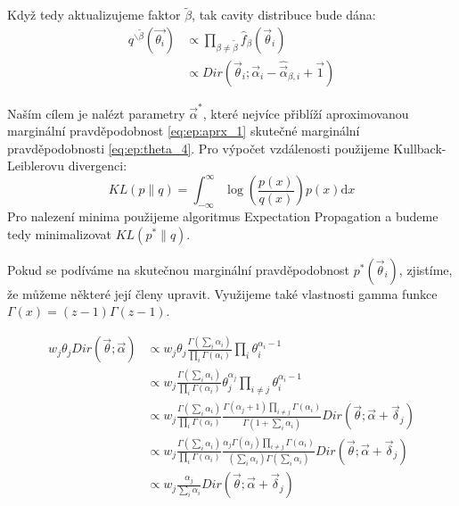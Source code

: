 Když tedy aktualizujeme faktor $\tilde\beta$, tak cavity distribuce bude dána:
\begin{align}
q^{\backslash \tilde\beta}(\vec{\theta_i}) &\propto \prod_{\beta \ne
    \tilde\beta} \hat{f}_{\beta}(\vec{\theta}_i) \\
& \propto Dir(\vec{\theta}_i; \vec{\alpha}_i - \hat{\vec{\alpha}}_{\beta, i} +
    \vec{1})
\end{align}

Naším cílem je nalézt parametry $\vec{\alpha}^*$, které nejvíce přiblíží
aproximovanou marginální pravděpodobnost \eqref{eq:ep:aprx_1} skutečné
marginální pravděpodobnosti \eqref{eq:ep:theta_4}. Pro výpočet vzdálenosti
použijeme Kullback-Leiblerovu divergenci:
\begin{equation}
KL(p \| q) = \int_{-\infty}^{\infty} \log\left(\frac{p(x)}{q(x)}\right)p(x)
    \mathrm{d}x
\end{equation}
Pro nalezení minima použijeme algoritmus Expectation Propagation a budeme tedy
minimalizovat $KL(p^*\| q)$.

Pokud se podíváme na skutečnou marginální pravděpodobnost
$p^*(\vec{\theta}_i)$, zjistíme, že můžeme některé její členy upravit.
Využijeme také vlastnosti gamma funkce $\Gamma(x) = (z-1) \Gamma(z-1)$.

\begin{align}
w_j \theta_j Dir(\vec{\theta}; \vec{\alpha}) &\propto
    w_j \theta_j \frac{\Gamma (\sum_i \alpha_{i})}{\prod_i \Gamma(\alpha_i)}
    \prod_i \theta_{i}^{\alpha_{i} - 1} \\
&\propto w_j \frac{\Gamma (\sum_i \alpha_{i})} {\prod_i
    \Gamma(\alpha_{i})} \theta_j^{\alpha_j} \prod_{i \ne j}
    \theta_{i}^{\alpha_{i} - 1} \\
&\propto w_j
    \frac{\Gamma (\sum_i \alpha_{i})}
         {\prod_i \Gamma(\alpha_{i})}
    \frac{\Gamma(\alpha_{j} + 1) \prod_{i \ne j} \Gamma(\alpha_i)}
         {\Gamma (1 + \sum_i \alpha_i)}
    Dir(\vec\theta; \vec{\alpha} + \vec{\delta}_j) \\
&\propto w_j
    \frac{\Gamma (\sum_i \alpha_{i})}
         {\prod_i \Gamma(\alpha_{i})}
    \frac{\alpha_j \Gamma(\alpha_j) \prod_{i \ne j} \Gamma(\alpha_i)}
         {(\sum_i \alpha_i) \Gamma (\sum_i \alpha_i)}
    Dir(\vec\theta; \vec{\alpha} + \vec{\delta}_j) \\
&\propto w_j
    \frac{\alpha_j}
         {\sum_i \alpha_i}
    Dir(\vec\theta; \vec{\alpha} + \vec{\delta}_j) \\
\end{align}

